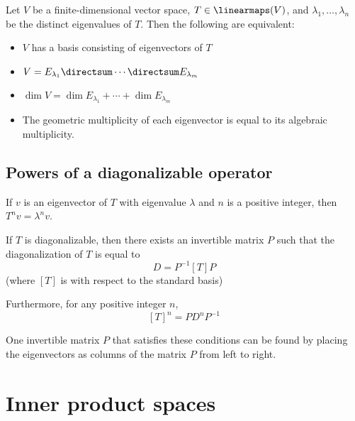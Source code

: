
\begin{theorem}
  Let $V$ be a finite-dimensional vector space, $T \in \linearmaps(V)$, and $\lambda_1, \ldots, \lambda_n$ be the distinct eigenvalues of $T$. Then the following are equivalent:
  \begin{itemize}
    \item $V$ has a basis consisting of eigenvectors of $T$
    \item $V = E_{\lambda_1} \directsum \cdots \directsum E_{\lambda_m}$
    \item $\dim V = \dim E_{\lambda_1} + \cdots + \dim E_{\lambda_m}$
    \item The geometric multiplicity of each eigenvector is equal to its algebraic multiplicity.
  \end{itemize}
\end{theorem}

\subsection{Powers of a diagonalizable operator}

\begin{lemma}
  If $v$ is an eigenvector of $T$ with eigenvalue $\lambda$ and $n$ is a positive integer, then $T^n v = \lambda^n v$.
\end{lemma}

\begin{lemma}
  If $T$ is diagonalizable, then there exists an invertible matrix $P$ such that the diagonalization of $T$ is equal to
  \[
    D = P^{-1} [T] P
  \]
  (where $[T]$ is with respect to the standard basis)

  Furthermore, for any positive integer $n$,
  \[
    [T]^n = P D^n P^{-1}
  \]

  One invertible matrix $P$ that satisfies these conditions can be found by placing the eigenvectors as columns of the matrix $P$ from left to right.
\end{lemma}

\section{Inner product spaces}

